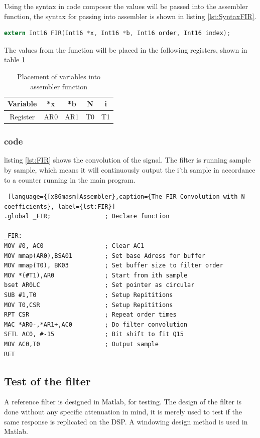 Using the syntax in code composer the values will be passed into the assembler function, the syntax for passing into assembler is shown in listing \ref{lst:SyntaxFIR}.
\begin{lstlisting}[language={C},caption={Function prototype}, label={lst:SyntaxFIR}]
extern Int16 FIR(Int16 *x, Int16 *b, Int16 order, Int16 index);
\end{lstlisting}
The values from the function will be placed in the following registers, shown in table \ref{tab:Assemblerpassing}

\begin{table}[H]
	\centering
	\begin{tabular}{c|cccc}
		Variable & *x & *b & N & i \\ \hline
		Register & AR0 & AR1 & T0 & T1
	\end{tabular} 
	\caption{Placement of variables into assembler function}
	\label{tab:Assemblerpassing}
\end{table}


\subsubsection{code}
listing \ref{lst:FIR} shows the convolution of the signal. The filter is running sample by sample, which means it will continuously output the i'th sample in accordance to a counter running in the main program.  
\begin{lstlisting} [language={[x86masm]Assembler},caption={The FIR Convolution with N coefficients}, label={lst:FIR}]
.global _FIR;				; Declare function 

_FIR:	
MOV #0, AC0					; Clear AC1
MOV mmap(AR0),BSA01			; Set base Adress for buffer
MOV mmap(T0), BK03			; Set buffer size to filter order
MOV *(#T1),AR0				; Start from ith sample
bset AR0LC					; Set pointer as circular
SUB #1,T0					; Setup Repititions
MOV T0,CSR					; Setup Repititions
RPT CSR						; Repeat order times
MAC *AR0-,*AR1+,AC0 		; Do filter convolution
SFTL AC0, #-15				; Bit shift to fit Q15
MOV AC0,T0					; Output sample
RET
\end{lstlisting}



\subsection{Test of the filter}
A reference filter is designed in Matlab, for testing. The design of the filter is done without any specific attenuation in mind, it is merely used to test if the same response is replicated on the DSP. A windowing design method is used in Matlab.

